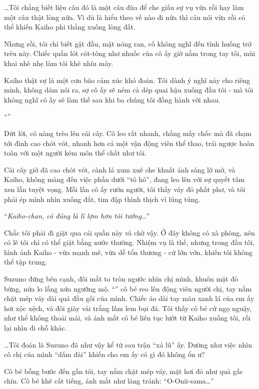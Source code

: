 \documentclass[../main.tex]{subfiles}
\begin{document}
\dots Tôi chẳng biết liệu câu đó là một câu đùa để che giấu sự vụ vừa rồi hay làm một câu thật lòng nữa. Vì dù là hiểu theo vế nào đi  nữa thì câu nói vừa rồi có thể khiến Kaiho phi thẳng xuống lòng đất.

Nhưng rồi, tôi chỉ biết gật đầu, mặt nóng ran, cố không nghĩ đến tình huống trớ trêu này. Chiếc quần lót cót-tông nhơ nhuốc của cô ấy giờ nằm trong tay tôi, mùi khai nhè nhẹ làm tôi khẽ nhíu mày.

Kaiho thật sự là một cơn bão cảm xúc khó đoán. Tôi dành ý nghĩ này cho riêng mình, không dám nói ra, sợ cô ấy sẽ ném cả dép quai hậu xuống đầu tôi - mà tôi không nghĩ cô ấy sẽ làm thế sau khi ba chúng tôi đồng hành với nhau.

``''

Dứt lời, cô nàng trèo lên cái cây. Cô leo rất nhanh, chẳng mấy chốc mà đã chạm tới đỉnh cao chót vót, nhanh hơn cả một vận động viên thể thao, trái ngược hoàn toàn với một người kém môn thể chất như tôi.

Cái cây giờ đã cao chót vót, cành lá xum xuê che khuất ánh sáng lờ mờ, và Kaiho, không màng đến việc phần dưới ``tô hô'', đang leo lên với sự quyết tâm xen lẫn tuyệt vọng. Mỗi lần cô ấy rướn người, tôi thấy váy đỏ phất phơ, và tôi phải ép mình nhìn xuống đất, tim đập thình thịch vì lúng túng.

``\textit{Kaiho-chan, cô đúng là lì lợm hơn tôi tưởng\dots}''

Chắc tôi phải đi giặt qua cái quần này và chờ vậy. Ở đây không có xà phòng, nên có lẽ tôi chỉ có thể giặt bằng nước thường. Nhiệm vụ là thế, nhưng trong đầu tôi, hình ảnh Kaiho - vừa mạnh mẽ, vừa dễ tổn thương - cứ lởn vởn, khiến tôi không thể tập trung.

Suzuno đứng bên cạnh, đôi mắt to tròn ngước nhìn chị mình, khuôn mặt đỏ bừng, nửa lo lắng nửa ngưỡng mộ. ``'' cô bé reo lên động viên người chị, tay nắm chặt mép váy dài quá đầu gối của mình. Chiếc áo dài tay màu xanh lá của em ấy hơi xộc xệch, và đôi giày vải trắng lấm lem bụi đá. Tôi thấy cô bé cứ ngọ nguậy, như thể không thoải mái, và ánh mắt cô bé liên tục lướt từ Kaiho xuống tôi, rồi lại nhìn đi chỗ khác.

\dots Tôi đoán là Suzuno đã như vậy kể từ sau trận ``xả lũ'' ấy. Dường như việc nhìn cô chị của mình ``dấm đài'' khiến cho em ấy có gì đó không ổn ư?

Cô bé bỗng bước đến gần tôi, tay nắm chặt mép váy, mặt hơi đỏ như quả gấc chín. Cô bé khẽ cất tiếng, ánh mắt như lảng tránh: ``O-Onii-sama\dots''
\end{document}
